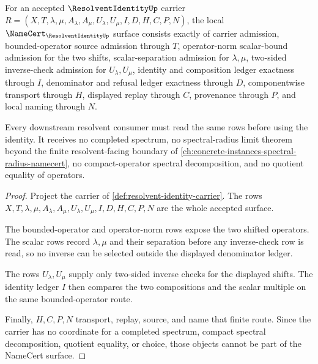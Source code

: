 \begin{theorem}
\label{thm:resolvent-identity-namecert-obligations}
For an accepted $\ResolventIdentityUp$ carrier $R=(X,T,\lambda,\mu,A_\lambda,A_\mu,U_\lambda,U_\mu,I,D,H,C,P,N)$, the local $\NameCert_{\ResolventIdentityUp}$ surface consists exactly of carrier admission, bounded-operator source admission through $T$, operator-norm scalar-bound admission for the two shifts, scalar-separation admission for $\lambda,\mu$, two-sided inverse-check admission for $U_\lambda,U_\mu$, identity and composition ledger exactness through $I$, denominator and refusal ledger exactness through $D$, componentwise transport through $H$, displayed replay through $C$, provenance through $P$, and local naming through $N$.

Every downstream resolvent consumer must read the same rows before using the identity. It receives no completed spectrum, no spectral-radius limit theorem beyond the finite resolvent-facing boundary of \autoref{ch:concrete-instances-spectral-radius-namecert}, no compact-operator spectral decomposition, and no quotient equality of operators.
\end{theorem}
\begin{proof}
Project the carrier of \autoref{def:resolvent-identity-carrier}. The rows $X,T,\lambda,\mu,A_\lambda,A_\mu,U_\lambda,U_\mu,I,D,H,C,P,N$ are the whole accepted surface.

The bounded-operator and operator-norm rows expose the two shifted operators. The scalar rows record $\lambda,\mu$ and their separation before any inverse-check row is read, so no inverse can be selected outside the displayed denominator ledger.

The rows $U_\lambda,U_\mu$ supply only two-sided inverse checks for the displayed shifts. The identity ledger $I$ then compares the two compositions and the scalar multiple on the same bounded-operator route.

Finally, $H,C,P,N$ transport, replay, source, and name that finite route. Since the carrier has no coordinate for a completed spectrum, compact spectral decomposition, quotient equality, or choice, those objects cannot be part of the NameCert surface.
\end{proof}

